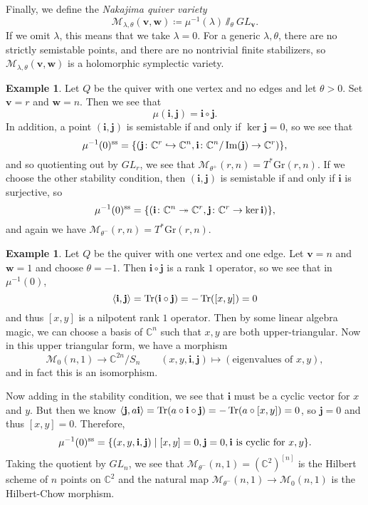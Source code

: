 \documentclass{amsart}
\theoremstyle{definition}
\newtheorem{exm}[thm]{Example}
\theoremstyle{remark}
\theoremstyle{plain}
\theoremstyle{definition}
\theoremstyle{remark}
\newcommand{\C}{\mathbb{C}}
\newcommand{\mc}[1]{\mathcal{#1}}
\newcommand{\mbf}[1]{\mathbf{#1}}
\newcommand{\mr}[1]{\mathrm{#1}}
\newcommand{\1}{\mathbf{1}}
\newcommand{\2}{\mathbf{2}}
\newcommand{\3}{\mathbf{3}}
\begin{document}
Finally, we define the \textit{Nakajima quiver variety} 
\[ \mc{M}_{\lambda,\theta}(\mbf{v}, \mbf{w}) \coloneqq \mu^{-1}(\lambda) \sslash_{\theta} GL_{\mbf{v}}. \]
If we omit $\lambda$, this means that we take $\lambda = 0$. For a generic $\lambda, \theta$, there are no strictly semistable points, and there are no nontrivial finite stabilizers, so $\mc{M}_{\lambda,\theta}(\mbf{v}, \mbf{w})$ is a holomorphic symplectic variety.

\begin{exm}
    Let $Q$ be the quiver with one vertex and no edges and let $\theta > 0$. Set $\mathbf{v} = r$ and $\mathbf{w} = n$. Then we see that 
    \[ \mu(\mbf{i}, \mbf{j}) = \mbf{i} \circ \mbf{j}. \]
    In addition, a point $(\mbf{i}, \mbf{j})$ is semistable if and only if $\ker \mbf{j} = 0$, so we see that
    \[ \mu^{-1}(0)^{\mr{ss}} = \qty{( \mbf{j} \colon \C^r \hookrightarrow \C^n, \mbf{i} \colon \C^n/\Im(\mbf{j}) \to \C^r )}, \]
    and so quotienting out by $GL_r$, we see that $\mc{M}_{\theta^+}(r, n) = T^* \mr{Gr}(r, n)$. If we choose the other stability condition, then $(\mbf{i}, \mbf{j})$ is semistable if and only if $\mbf{i}$ is surjective, so
    \[ \mu^{-1}(0)^{\mr{ss}} = \qty{( \mbf{i} \colon \C^n \twoheadrightarrow \C^r, \mbf{j} \colon \C^r \to \ker \mbf{i} )}, \]
    and again we have $\mc{M}_{\theta^-}(r, n) = T^* \mr{Gr}(r, n)$.
\end{exm}

\begin{exm}
    Let $Q$ be the quiver with one vertex and one edge. Let $\mbf{v} = n$ and $\mbf{w} = 1$ and choose $\theta = -1$. Then $\mbf{i} \circ \mbf{j}$ is a rank $1$ operator, so we see that in $\mu^{-1}(0)$,
    \[ \ev{\mbf{i}, \mbf{j}} = \Tr(\mbf{i} \circ \mbf{j}) = -\Tr([x,y]) = 0 \]
    and thus $[x,y]$ is a nilpotent rank $1$ operator. Then by some linear algebra magic, we can choose a basis of $\C^n$ such that $x,y$ are both upper-triangular. Now in this upper triangular form, we have a morphism
    \[ \mc{M}_0(n,1) \to \C^{2n}/S_n \qquad (x,y,\mbf{i}, \mbf{j}) \mapsto (\text{eigenvalues of }x,y), \]
    and in fact this is an isomorphism.

    Now adding in the stability condition, we see that $\mbf{i}$ must be a cyclic vector for $x$ and $y$. But then we know $\ev{\mbf{j}, a\mbf{i}} = \Tr(a \circ \mbf{i} \circ \mbf{j}) = -\Tr(a \circ [x,y]) = 0$, so $\mbf{j} = 0$ and thus $[x,y] = 0$. Therefore,
    \[ \mu^{-1}(0)^{\mr{ss}} = \qty{(x,y, \mbf{i},\mbf{j}) \mid [x,y] = 0, \mbf{j} = 0, \mbf{i} \text{ is cyclic for } x,y}. \]
    Taking the quotient by $GL_n$, we see that $\mc{M}_{\theta^-}(n, 1) = (\C^2)^{[n]}$ is the Hilbert scheme of $n$ points on $\C^2$ and the natural map $\mc{M}_{\theta^-}(n, 1) \to \mc{M}_0(n,1)$ is the Hilbert-Chow morphism.
\end{exm}
\end{document}
